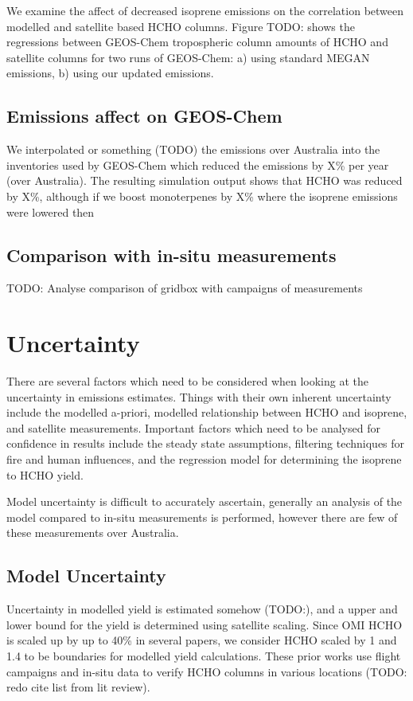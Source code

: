     We examine the affect of decreased isoprene emissions on the correlation between modelled and satellite based HCHO columns.
    Figure TODO: shows the regressions between GEOS-Chem tropospheric column amounts of HCHO and satellite columns for two runs of GEOS-Chem: a) using standard MEGAN emissions, b) using our updated emissions.
    
  \subsection{Emissions affect on GEOS-Chem}
    We interpolated or something (TODO) the emissions over Australia into the inventories used by GEOS-Chem which reduced the emissions by X\% per year (over Australia).
    The resulting simulation output shows that HCHO was reduced by X\%, although if we boost monoterpenes by X\% where the isoprene emissions were lowered then 
  
  \subsection{Comparison with in-situ measurements}
    
    TODO: %
    Analyse comparison of gridbox with campaigns of measurements
    
\section{Uncertainty}
\label{BioIsop:Uncertainty}

  There are several factors which need to be considered when looking at the uncertainty in emissions estimates.
  Things with their own inherent uncertainty include the modelled a-priori, modelled relationship between HCHO and isoprene, and satellite measurements. 
  Important factors which need to be analysed for confidence in results include the steady state assumptions, filtering techniques for fire and human influences, and the regression model for determining the isoprene to HCHO yield.
  
  Model uncertainty is difficult to accurately ascertain, generally an analysis of the model compared to in-situ measurements is performed, however there are few of these measurements over Australia.
  
  \subsection{Model Uncertainty}
    \label{Model:Uncertainty:Model}
    Uncertainty in modelled yield is estimated somehow (TODO:), and a upper and lower bound for the yield is determined using satellite scaling.
    Since OMI HCHO is scaled up by up to 40\% in several papers, we consider HCHO scaled by 1 and 1.4 to be boundaries for modelled yield calculations.
    These prior works use flight campaigns and in-situ data to verify HCHO columns in various locations (TODO: redo cite list from lit review).
    

